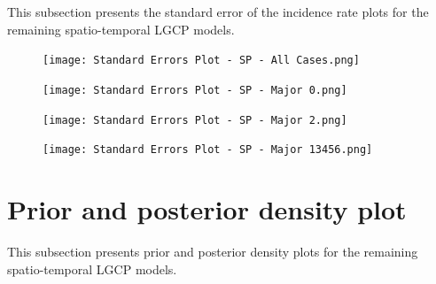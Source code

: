 \begin{appendices}
    This subsection presents the standard error of the incidence rate plots for the remaining spatio-temporal LGCP models.

    \begin{figure}[H]
        \begin{center}
            \texttt{[image: Standard Errors Plot - SP - All Cases.png]}
        \end{center}
    \end{figure}

    \begin{figure}[H]
        \begin{center}
            \texttt{[image: Standard Errors Plot - SP - Major 0.png]}
        \end{center}
    \end{figure}

    \begin{figure}[H]
        \begin{center}
            \texttt{[image: Standard Errors Plot - SP - Major 2.png]}
        \end{center}
    \end{figure}

    \begin{figure}[H]
        \begin{center}
            \texttt{[image: Standard Errors Plot - SP - Major 13456.png]}
        \end{center}
    \end{figure}

    \newpage


\section{Prior and posterior density plot} \label{app:density-plot}

    This subsection presents prior and posterior density plots for the remaining spatio-temporal LGCP models.


\end{appendices}
